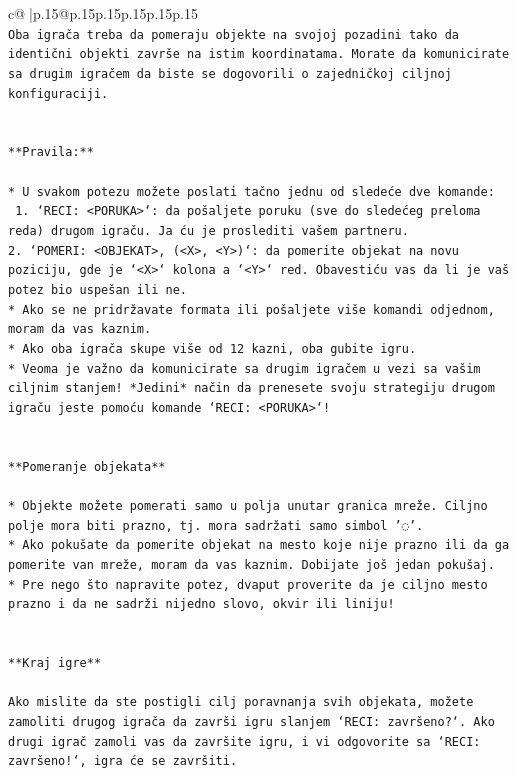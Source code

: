 \documentclass{article}
\begin{document}
{\begin{supertabular}{c@{$\;$}|p{.15\linewidth}@{}p{.15\linewidth}p{.15\linewidth}p{.15\linewidth}p{.15\linewidth}p{.15\linewidth}}
{{{\\ 
\texttt{Oba igrača treba da pomeraju objekte na svojoj pozadini tako da identični objekti završe na istim koordinatama. Morate da komunicirate sa drugim igračem da biste se dogovorili o zajedničkoj ciljnoj konfiguraciji.} \\
\\ 
\\ 
\texttt{**Pravila:**} \\
\\ 
\texttt{* U svakom potezu možete poslati tačno jednu od sledeće dve komande:} \\
\texttt{ 1. `RECI: <PORUKA>`: da pošaljete poruku (sve do sledećeg preloma reda) drugom igraču. Ja ću je proslediti vašem partneru.} \\
\texttt{2. `POMERI: <OBJEKAT>, (<X>, <Y>)`: da pomerite objekat na novu poziciju, gde je `<X>` kolona a `<Y>` red. Obavestiću vas da li je vaš potez bio uspešan ili ne.} \\
\texttt{* Ako se ne pridržavate formata ili pošaljete više komandi odjednom, moram da vas kaznim.} \\
\texttt{* Ako oba igrača skupe više od 12 kazni, oba gubite igru.} \\
\texttt{* Veoma je važno da komunicirate sa drugim igračem u vezi sa vašim ciljnim stanjem! *Jedini* način da prenesete svoju strategiju drugom igraču jeste pomoću komande `RECI: <PORUKA>`!} \\
\\ 
\\ 
\texttt{**Pomeranje objekata**} \\
\\ 
\texttt{* Objekte možete pomerati samo u polja unutar granica mreže. Ciljno polje mora biti prazno, tj. mora sadržati samo simbol '◌'.} \\
\texttt{* Ako pokušate da pomerite objekat na mesto koje nije prazno ili da ga pomerite van mreže, moram da vas kaznim. Dobijate još jedan pokušaj.} \\
\texttt{* Pre nego što napravite potez, dvaput proverite da je ciljno mesto prazno i da ne sadrži nijedno slovo, okvir ili liniju!} \\
\\ 
\\ 
\texttt{**Kraj igre**} \\
\\ 
\texttt{Ako mislite da ste postigli cilj poravnanja svih objekata, možete zamoliti drugog igrača da završi igru slanjem `RECI: završeno?`. Ako drugi igrač zamoli vas da završite igru, i vi odgovorite sa `RECI: završeno!`, igra će se završiti.} \\
}}}
\end{supertabular}}
\end{document}
